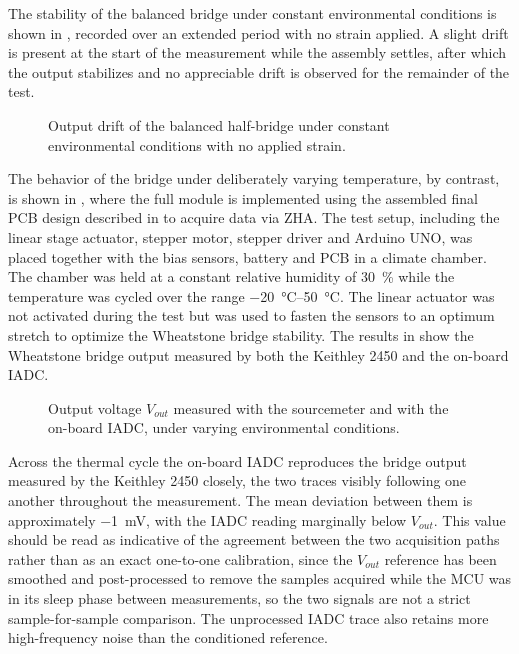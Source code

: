 The stability of the balanced bridge under constant environmental conditions is shown in , recorded over an extended period with no strain applied. A slight drift is present at the start of the measurement while the assembly settles, after which the output stabilizes and no appreciable drift is observed for the remainder of the test.

\begin{figure}[!b]
\centering

    \caption{Output drift of the balanced half-bridge under constant environmental conditions with no applied strain.}
    \label{fig:Wheatstone_drift}
\end{figure}

The behavior of the bridge under deliberately varying temperature, by contrast, is shown in , where the full module is implemented using the assembled final PCB design described in  to acquire data via ZHA. The test setup, including the linear stage actuator, stepper motor, stepper driver and Arduino UNO, was placed together with the bias sensors, battery and PCB in a climate chamber. The chamber was held at a constant relative humidity of \SI{30}{\percent} while the temperature was cycled over the range \SIrange{-20}{50}{\celsius}. The linear actuator was not activated during the test but was used to fasten the sensors to an optimum stretch to optimize the Wheatstone bridge stability. The results in  show the Wheatstone bridge output measured by both the Keithley 2450 and the on-board IADC.

\begin{figure}
\centering

    \caption{Output voltage \(V_{out}\) measured with the sourcemeter and with the on-board IADC, under varying environmental conditions.}
    \label{fig:FS_ADCogVout}
\end{figure}

Across the thermal cycle the on-board IADC reproduces the bridge output measured by the Keithley 2450 closely, the two traces visibly following one another throughout the measurement. The mean deviation between them is approximately \SI{-1}{\milli\volt}, with the IADC reading marginally below \(V_{out}\). This value should be read as indicative of the agreement between the two acquisition paths rather than as an exact one-to-one calibration, since the \(V_{out}\) reference has been smoothed and post-processed to remove the samples acquired while the MCU was in its sleep phase between measurements, so the two signals are not a strict sample-for-sample comparison. The unprocessed IADC trace also retains more high-frequency noise than the conditioned reference.


